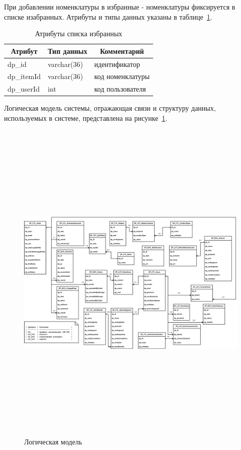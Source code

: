 При добавлении номенклатуры в избранные - номенклатуры фиксируется в списке изабранных.
Атрибуты и типы данных указаны в таблице~\ref{tab:DP_LST_FavoriteItems}.

\begin{table}[!htb]
    \centering\small

    \caption{Атрибуты списка избранных}
    \label{tab:DP_LST_FavoriteItems}

    \begin{tabular}{|p{5cm}|p{2.5cm}|p{9cm}|}
        \hline
        \multicolumn{1}{|c|}{Атрибут}
        & \multicolumn{1}{c|}{Тип данных}
        & \multicolumn{1}{c|}{Комментарий}
        \\ \hline

        dp\_id & varchar(36) & идентификатор \\ \hline
        dp\_itemId & varchar(36) & код номенклатуры \\ \hline
        dp\_userId & int & код пользователя \\ \hline
    \end{tabular}
\end{table}

Логическая модель системы, отражающая связи и структуру данных,
используемых в системе,
представлена на рисунке~\ref{fig:db_logic_model}.




\begin{figure}
    \centering

    \includegraphics[height=16cm]
    {images/db/db.png}

    \caption{Логическая модель}

    \label{fig:db_logic_model}
\end{figure}

